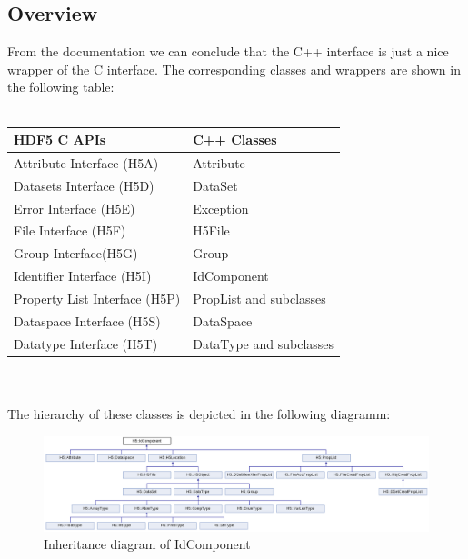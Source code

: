 \documentclass{article}
\begin{document}
\subsection{Overview}
From the documentation we can conclude that the C++ interface is just a nice wrapper of the C interface. The corresponding classes and wrappers are shown in the following table:\\
\\
\begin{tabular}{|l|l|}
\hline
HDF5 C APIs&C++ Classes\\
\hline
Attribute Interface (H5A)&Attribute\\
Datasets Interface (H5D)&DataSet\\
Error Interface (H5E)&Exception\\
File Interface (H5F)&H5File\\
Group Interface(H5G)&Group\\
Identifier Interface (H5I)&IdComponent\\
Property List Interface (H5P)&PropList and subclasses\\
Dataspace Interface (H5S)&DataSpace\\
Datatype Interface (H5T)&DataType and subclasses\\
\hline
\end{tabular}\\
\\
The hierarchy of these classes is depicted in the following diagramm:\\
\begin{figure}[H]
\includegraphics[scale=0.39]{inheritance_diagramm.png}
\caption{Inheritance diagram of IdComponent}
\end{figure}
\end{document}

